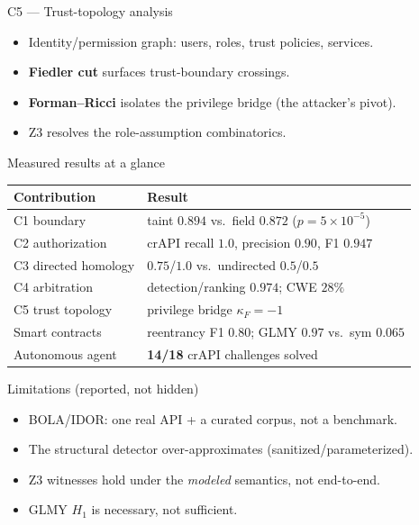 \documentclass[aspectratio=169,11pt]{beamer}
\begin{document}
\begin{frame}{C5 --- Trust-topology analysis}
  \begin{itemize}
    \item Identity/permission graph: users, roles, trust policies, services.
    \item \textbf{Fiedler cut} surfaces trust-boundary crossings.
    \item \textbf{Forman--Ricci} isolates the privilege bridge (the attacker's pivot).
    \item Z3 resolves the role-assumption combinatorics.
  \end{itemize}
\end{frame}

\begin{frame}{Measured results at a glance}
  \begin{center}
  \begin{tabular}{ll}
  \toprule
  \textbf{Contribution} & \textbf{Result} \\
  \midrule
  C1 boundary & taint $0.894$ vs.\ field $0.872$ ($p=5\times10^{-5}$) \\
  C2 authorization & crAPI recall $1.0$, precision $0.90$, F1 $0.947$ \\
  C3 directed homology & $0.75$/$1.0$ vs.\ undirected $0.5$/$0.5$ \\
  C4 arbitration & detection/ranking $0.974$; CWE $28\%$ \\
  C5 trust topology & privilege bridge $\kappa_F=-1$ \\
  Smart contracts & reentrancy F1 $0.80$; GLMY $0.97$ vs.\ sym $0.065$ \\
  Autonomous agent & \textbf{14/18} crAPI challenges solved \\
  \bottomrule
  \end{tabular}
  \end{center}
\end{frame}

\begin{frame}{Limitations (reported, not hidden)}
  \begin{itemize}
    \item BOLA/IDOR: one real API + a curated corpus, not a benchmark.
    \item The structural detector over-approximates (sanitized/parameterized).
    \item Z3 witnesses hold under the \emph{modeled} semantics, not end-to-end.
    \item GLMY $H_1$ is necessary, not sufficient.
  \end{itemize}
\end{frame}
\end{document}
